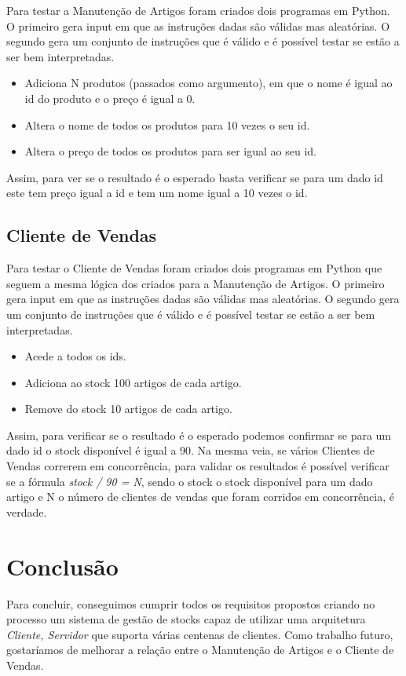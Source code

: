 \documentclass[a4paper]{report}
\begin{document}
Para testar a Manutenção de Artigos foram criados dois programas em Python.
O primeiro gera input em que as instruções dadas são válidas mas aleatórias.
O segundo gera um conjunto de instruções que é válido e é possível testar se estão
a ser bem interpretadas.
\begin{itemize} 
    \item Adiciona N produtos (passados como argumento), em que o nome é igual ao id do
        produto e o preço é igual a 0.
    \item Altera o nome de todos os produtos para 10 vezes o seu id.
    \item Altera o preço de todos os produtos para ser igual ao seu id.
\end{itemize}
Assim, para ver se o resultado é o esperado basta verificar se para um dado id
este tem preço igual a id e tem um nome igual a 10 vezes o id.

\section{Cliente de Vendas}

Para testar o Cliente de Vendas foram criados dois programas em Python que
seguem a mesma lógica dos criados para a Manutenção de Artigos.
O primeiro gera input em que as instruções dadas são válidas mas aleatórias.
O segundo gera um conjunto de instruções que é válido e é possível testar se estão
a ser bem interpretadas.
\begin{itemize} 
    \item Acede a todos os ids.
    \item Adiciona ao stock 100 artigos de cada artigo.
    \item Remove do stock 10 artigos de cada artigo.
\end{itemize}
Assim, para verificar se o resultado é o esperado podemos confirmar se para um dado
id o stock disponível é igual a 90.
Na mesma veia, se vários Clientes de Vendas correrem em concorrência, para validar
os resultados é possível verificar se a fórmula \textit{stock / 90 = N}, sendo o stock o stock
disponível para um dado artigo e N o número de clientes de vendas que foram corridos
em concorrência, é verdade.

\chapter{Conclusão}

Para concluir, conseguimos cumprir todos os requisitos propostos criando no processo um
sistema de gestão de stocks capaz de utilizar uma arquitetura \textit{Cliente, Servidor}
que suporta várias centenas de clientes.
Como trabalho futuro, gostaríamos de melhorar a relação entre o Manutenção de Artigos e
o Cliente de Vendas.
\end{document}
